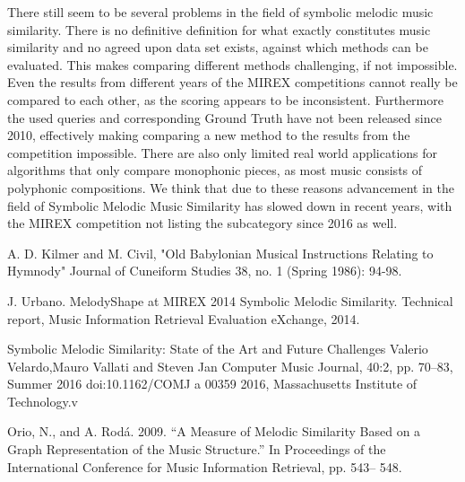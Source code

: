 \documentclass{llncs}
\begin{document}
\begin{itemize}
	There still seem to be  several problems in the field of symbolic melodic music similarity.
	There is no definitive definition for what exactly constitutes music similarity and no agreed upon data set exists, against which methods can be evaluated. This makes comparing different methods challenging, if not impossible. Even the results from different years of the MIREX competitions cannot really be compared to each other, as the scoring appears to be inconsistent. Furthermore the used queries and corresponding Ground Truth have not been released since 2010, effectively making comparing a new method to the results from the competition impossible. There are also only limited real world applications for algorithms that only compare monophonic pieces, as most music consists of polyphonic compositions. We think that due to these reasons advancement in the field of Symbolic Melodic Music Similarity has slowed down in recent years, with the MIREX competition not listing the subcategory since 2016 as well.

	\begin{thebibliography}{7}
	
	A. D. Kilmer and M. Civil, 
	"Old Babylonian Musical Instructions Relating to Hymnody" 
	Journal of Cuneiform Studies 38, 
	no. 1 (Spring 1986): 94-98.

	J. Urbano. MelodyShape at 
	MIREX 2014 Symbolic Melodic Similarity. 
	Technical report, Music Information Retrieval Evaluation eXchange, 2014.

	Symbolic Melodic Similarity: State of the Art and Future Challenges
	Valerio Velardo,Mauro Vallati and Steven Jan
	Computer Music Journal, 40:2, pp. 70–83, Summer 2016 doi:10.1162/COMJ a 00359
	2016, Massachusetts Institute of Technology.v

	 Orio, N., and A. Rodá. 2009. “A Measure of Melodic Similarity Based on a Graph Representation of the Music Structure.” In Proceedings of the International Conference for Music Information Retrieval, pp. 543– 548.


\end{thebibliography}
\end{itemize}
\end{document}
